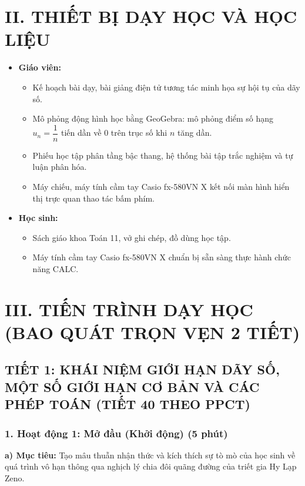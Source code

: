\documentclass[12pt, a4paper]{article}
\begin{document}
\section*{II. THIẾT BỊ DẠY HỌC VÀ HỌC LIỆU}

\begin{itemize}[leftmargin=1.2cm]
    \item \textbf{Giáo viên:}
    \begin{itemize}[leftmargin=0.6cm]
        \item Kế hoạch bài dạy, bài giảng điện tử tương tác minh họa sự hội tụ của dãy số.
        \item Mô phỏng động hình học bằng GeoGebra: mô phỏng điểm số hạng $u_n = \dfrac{1}{n}$ tiến dần về $0$ trên trục số khi $n$ tăng dần.
        \item Phiếu học tập phân tầng bậc thang, hệ thống bài tập trắc nghiệm và tự luận phân hóa.
        \item Máy chiếu, máy tính cầm tay Casio fx-580VN X kết nối màn hình hiển thị trực quan thao tác bấm phím.
    \end{itemize}
    \item \textbf{Học sinh:}
    \begin{itemize}[leftmargin=0.6cm]
        \item Sách giáo khoa Toán 11, vở ghi chép, đồ dùng học tập.
        \item Máy tính cầm tay Casio fx-580VN X chuẩn bị sẵn sàng thực hành chức năng CALC.
    \end{itemize}
\end{itemize}

\section*{III. TIẾN TRÌNH DẠY HỌC (BAO QUÁT TRỌN VẸN 2 TIẾT)}

\subsection*{TIẾT 1: KHÁI NIỆM GIỚI HẠN DÃY SỐ, MỘT SỐ GIỚI HẠN CƠ BẢN VÀ CÁC PHÉP TOÁN (TIẾT 40 THEO PPCT)}

\subsubsection*{1. Hoạt động 1: Mở đầu (Khởi động) (5 phút)}

\noindent \textbf{a) Mục tiêu:}
Tạo mâu thuẫn nhận thức và kích thích sự tò mò của học sinh về quá trình vô hạn thông qua nghịch lý chia đôi quãng đường của triết gia Hy Lạp Zeno.
\end{document}
